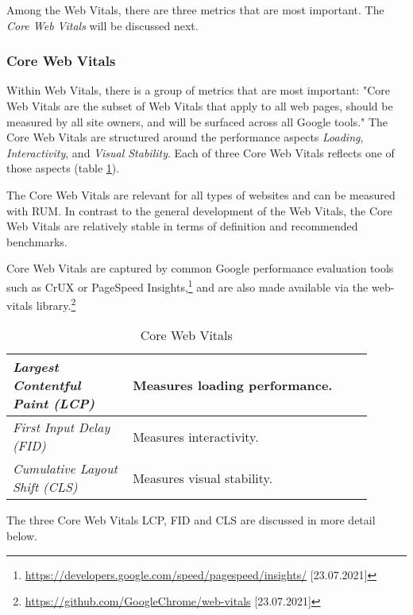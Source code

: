 
Among the Web Vitals, there are three metrics that are most important.
The \textit{Core Web Vitals} will be discussed next.



\subsubsection{Core Web Vitals} %
\label{subsubsection:core_web_vitals}

Within Web Vitals, there is a group of metrics that are most important:
"Core Web Vitals are the subset of Web Vitals that apply to all web pages, should be measured by all site owners, and will be surfaced across all Google tools." %
The Core Web Vitals are structured around the performance aspects \textit{Loading}, \textit{Interactivity}, and \textit{Visual Stability}.
Each of three Core Web Vitals reflects one of those aspects (table \ref{table:core_web_vitals}).

The Core Web Vitals are relevant for all types of websites and can be measured with RUM.
In contrast to the general development of the Web Vitals, the Core Web Vitals are relatively stable in terms of definition and recommended benchmarks.

Core Web Vitals are captured by common Google performance evaluation tools such as CrUX or PageSpeed Insights,\footnote{\url{https://developers.google.com/speed/pagespeed/insights/} [23.07.2021]}
and are also made available via the web-vitals library.\footnote{\url{https://github.com/GoogleChrome/web-vitals} [23.07.2021]}

\begin{table}[h]
	\small
	\centering
	\begin{tabular}{  p{0.3\linewidth} | p{0.6\linewidth} }
	\textit{Largest Contentful Paint (LCP)} & Measures loading performance.  \\
	\hline
	\textit{First Input Delay (FID)} & Measures interactivity. \\
	\hline
	\textit{Cumulative Layout Shift (CLS)} & Measures visual stability.  \\
	\end{tabular}
	\medskip
	\caption{Core Web Vitals}
	\label{table:core_web_vitals}
\end{table}

The three Core Web Vitals LCP, FID and CLS are discussed in more detail below.

